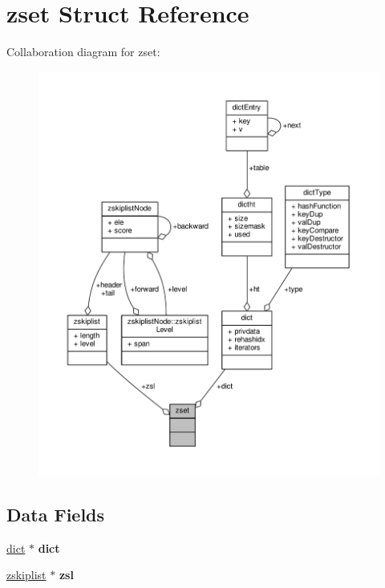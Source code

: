 \hypertarget{structzset}{}\section{zset Struct Reference}
\label{structzset}


Collaboration diagram for zset\+:\nopagebreak
\begin{figure}[H]
\begin{center}
\leavevmode
\includegraphics[width=350pt]{structzset__coll__graph}
\end{center}
\end{figure}
\subsection*{Data Fields}
\begin{DoxyCompactItemize}
\item 
\mbox{\label{structzset_ac0cad0ee575e89fbc809acef7ca685a9}} 
\hyperlink{structdict}{dict} $\ast$ {\bfseries dict}
\item 
\mbox{\label{structzset_ab52b4c6fca4654afba8002d76d109c79}} 
\hyperlink{structzskiplist}{zskiplist} $\ast$ {\bfseries zsl}
\end{DoxyCompactItemize}



